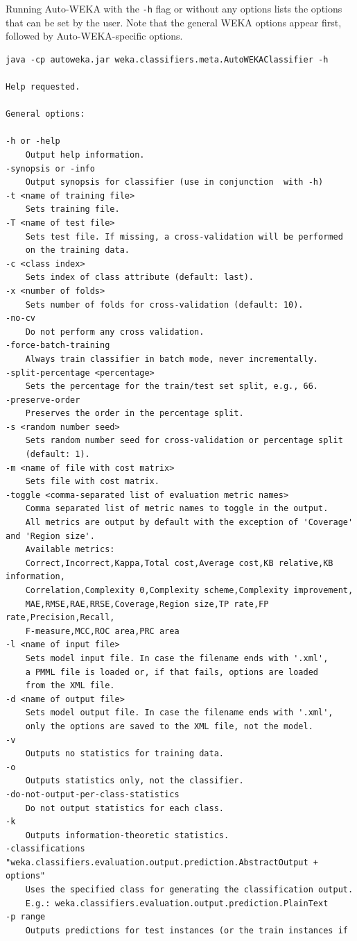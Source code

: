 \documentclass{article}
\begin{document}
Running Auto-WEKA with the \verb=-h= flag or without any options lists the
options that can be set by the user. Note that the general WEKA options appear
first, followed by Auto-WEKA-specific options.
\begin{verbatim}
java -cp autoweka.jar weka.classifiers.meta.AutoWEKAClassifier -h

Help requested.

General options:

-h or -help
	Output help information.
-synopsis or -info
	Output synopsis for classifier (use in conjunction  with -h)
-t <name of training file>
	Sets training file.
-T <name of test file>
	Sets test file. If missing, a cross-validation will be performed
	on the training data.
-c <class index>
	Sets index of class attribute (default: last).
-x <number of folds>
	Sets number of folds for cross-validation (default: 10).
-no-cv
	Do not perform any cross validation.
-force-batch-training
	Always train classifier in batch mode, never incrementally.
-split-percentage <percentage>
	Sets the percentage for the train/test set split, e.g., 66.
-preserve-order
	Preserves the order in the percentage split.
-s <random number seed>
	Sets random number seed for cross-validation or percentage split
	(default: 1).
-m <name of file with cost matrix>
	Sets file with cost matrix.
-toggle <comma-separated list of evaluation metric names>
	Comma separated list of metric names to toggle in the output.
	All metrics are output by default with the exception of 'Coverage' and 'Region size'.
	Available metrics:
	Correct,Incorrect,Kappa,Total cost,Average cost,KB relative,KB information,
	Correlation,Complexity 0,Complexity scheme,Complexity improvement,
	MAE,RMSE,RAE,RRSE,Coverage,Region size,TP rate,FP rate,Precision,Recall,
	F-measure,MCC,ROC area,PRC area
-l <name of input file>
	Sets model input file. In case the filename ends with '.xml',
	a PMML file is loaded or, if that fails, options are loaded
	from the XML file.
-d <name of output file>
	Sets model output file. In case the filename ends with '.xml',
	only the options are saved to the XML file, not the model.
-v
	Outputs no statistics for training data.
-o
	Outputs statistics only, not the classifier.
-do-not-output-per-class-statistics
	Do not output statistics for each class.
-k
	Outputs information-theoretic statistics.
-classifications "weka.classifiers.evaluation.output.prediction.AbstractOutput + options"
	Uses the specified class for generating the classification output.
	E.g.: weka.classifiers.evaluation.output.prediction.PlainText
-p range
	Outputs predictions for test instances (or the train instances if

\end{verbatim}
\end{document}
